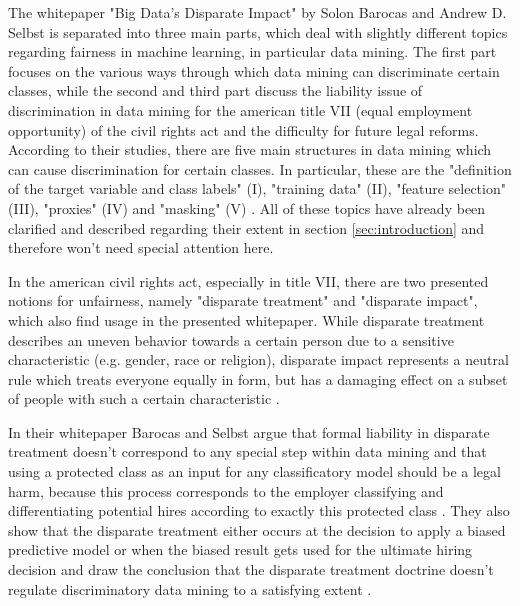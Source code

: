 The whitepaper "Big Data’s Disparate Impact" \cite{Barocas.2016} by Solon Barocas and 
Andrew D. Selbst is separated into three main parts, which deal with slightly different 
topics regarding fairness in machine learning, in particular data mining. The first part 
focuses on the various ways through which data mining can discriminate certain classes, 
while the second and third part discuss the liability issue of discrimination in data 
mining for the american title VII (equal employment opportunity) \cite{titleVII} of the 
civil rights act and the difficulty for future legal reforms.  According to their studies, there are five main structures in data mining which can 
cause discrimination for certain classes. In particular, these are the "definition of 
the target variable and class labels" (I), "training data" (II), "feature selection" (III), 
"proxies" (IV) and "masking" (V) \cite{Barocas.2016}. All of these topics have already 
been clarified and described regarding their extent in section \ref{sec:introduction} and 
therefore won't need special attention here.

In the american civil rights act, especially in title VII, there are two presented notions 
for unfairness, namely "disparate treatment" and "disparate impact", which also find 
usage in the presented whitepaper. While disparate treatment describes an uneven behavior 
towards a certain person due to a sensitive characteristic (e.g. gender, race or 
religion), disparate impact represents a neutral rule which treats everyone equally in 
form, but has a damaging effect on a subset of people with such a certain characteristic \cite{isabel02, isabel01}.

In their whitepaper Barocas and Selbst argue that formal liability in disparate treatment 
doesn't correspond to any special step within data mining and that using a protected 
class as an input for any classificatory model should be a legal harm, because this 
process corresponds to the employer classifying and differentiating potential hires 
according to exactly this protected class \cite{Barocas.2016}. They also show that the 
disparate treatment either occurs at the decision to apply  a biased predictive model 
or when the biased result gets used for the ultimate hiring decision and draw the 
conclusion that the disparate treatment doctrine doesn't regulate discriminatory 
data mining to a satisfying extent \cite{Barocas.2016}. 


